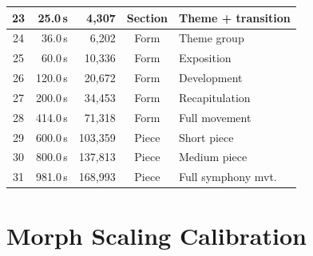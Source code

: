 \documentclass[10pt,twocolumn]{article}
\begin{document}
\begin{table}[H]
\begin{tabular}{@{}crrcl@{}}
23 & 25.0\,s   & 4,307 & Section & Theme + transition \\
\midrule
24 & 36.0\,s   & 6,202 & Form & Theme group \\
25 & 60.0\,s   & 10,336 & Form & Exposition \\
26 & 120.0\,s  & 20,672 & Form & Development \\
27 & 200.0\,s  & 34,453 & Form & Recapitulation \\
28 & 414.0\,s  & 71,318 & Form & Full movement \\
\midrule
29 & 600.0\,s  & 103,359 & Piece & Short piece \\
30 & 800.0\,s  & 137,813 & Piece & Medium piece \\
31 & 981.0\,s  & 168,993 & Piece & Full symphony mvt. \\
\bottomrule
\end{tabular}
\end{table}


\section{Morph Scaling Calibration}
\label{app:morph_scale}
\end{document}
